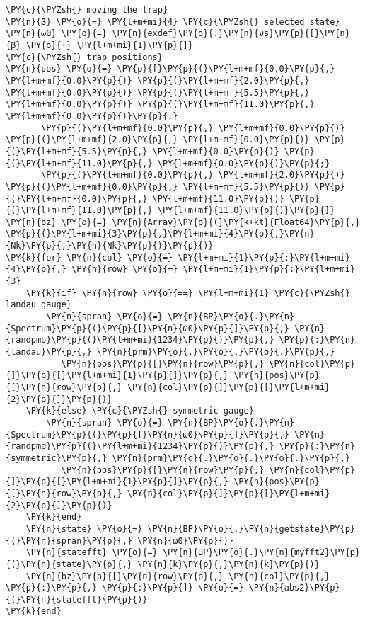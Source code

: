 \begin{Verbatim}[commandchars=\\\{\}]
\PY{c}{\PYZsh{} moving the trap}
\PY{n}{β} \PY{o}{=} \PY{l+m+mi}{4} \PY{c}{\PYZsh{} selected state}
\PY{n}{ω0} \PY{o}{=} \PY{n}{exdef}\PY{o}{.}\PY{n}{νs}\PY{p}{[}\PY{n}{β} \PY{o}{+} \PY{l+m+mi}{1}\PY{p}{]}
\PY{c}{\PYZsh{} trap positions}
\PY{n}{pos} \PY{o}{=} \PY{p}{[}\PY{p}{(}\PY{l+m+mf}{0.0}\PY{p}{,} \PY{l+m+mf}{0.0}\PY{p}{)} \PY{p}{(}\PY{l+m+mf}{2.0}\PY{p}{,} \PY{l+m+mf}{0.0}\PY{p}{)} \PY{p}{(}\PY{l+m+mf}{5.5}\PY{p}{,} \PY{l+m+mf}{0.0}\PY{p}{)} \PY{p}{(}\PY{l+m+mf}{11.0}\PY{p}{,} \PY{l+m+mf}{0.0}\PY{p}{)}\PY{p}{;}
       \PY{p}{(}\PY{l+m+mf}{0.0}\PY{p}{,} \PY{l+m+mf}{0.0}\PY{p}{)} \PY{p}{(}\PY{l+m+mf}{2.0}\PY{p}{,} \PY{l+m+mf}{0.0}\PY{p}{)} \PY{p}{(}\PY{l+m+mf}{5.5}\PY{p}{,} \PY{l+m+mf}{0.0}\PY{p}{)} \PY{p}{(}\PY{l+m+mf}{11.0}\PY{p}{,} \PY{l+m+mf}{0.0}\PY{p}{)}\PY{p}{;}
       \PY{p}{(}\PY{l+m+mf}{0.0}\PY{p}{,} \PY{l+m+mf}{2.0}\PY{p}{)} \PY{p}{(}\PY{l+m+mf}{0.0}\PY{p}{,} \PY{l+m+mf}{5.5}\PY{p}{)} \PY{p}{(}\PY{l+m+mf}{0.0}\PY{p}{,} \PY{l+m+mf}{11.0}\PY{p}{)} \PY{p}{(}\PY{l+m+mf}{11.0}\PY{p}{,} \PY{l+m+mf}{11.0}\PY{p}{)}\PY{p}{]}
\PY{n}{bz} \PY{o}{=} \PY{n}{Array}\PY{p}{(}\PY{k+kt}{Float64}\PY{p}{,} \PY{p}{(}\PY{l+m+mi}{3}\PY{p}{,}\PY{l+m+mi}{4}\PY{p}{,}\PY{n}{Nk}\PY{p}{,}\PY{n}{Nk}\PY{p}{)}\PY{p}{)}
\PY{k}{for} \PY{n}{col} \PY{o}{=} \PY{l+m+mi}{1}\PY{p}{:}\PY{l+m+mi}{4}\PY{p}{,} \PY{n}{row} \PY{o}{=} \PY{l+m+mi}{1}\PY{p}{:}\PY{l+m+mi}{3}
    \PY{k}{if} \PY{n}{row} \PY{o}{==} \PY{l+m+mi}{1} \PY{c}{\PYZsh{} landau gauge}
        \PY{n}{spran} \PY{o}{=} \PY{n}{BP}\PY{o}{.}\PY{n}{Spectrum}\PY{p}{(}\PY{p}{[}\PY{n}{ω0}\PY{p}{]}\PY{p}{,} \PY{n}{randpmp}\PY{p}{(}\PY{l+m+mi}{1234}\PY{p}{)}\PY{p}{,} \PY{p}{:}\PY{n}{landau}\PY{p}{,} \PY{n}{prm}\PY{o}{.}\PY{o}{.}\PY{o}{.}\PY{p}{,}
           \PY{n}{pos}\PY{p}{[}\PY{n}{row}\PY{p}{,} \PY{n}{col}\PY{p}{]}\PY{p}{[}\PY{l+m+mi}{1}\PY{p}{]}\PY{p}{,} \PY{n}{pos}\PY{p}{[}\PY{n}{row}\PY{p}{,} \PY{n}{col}\PY{p}{]}\PY{p}{[}\PY{l+m+mi}{2}\PY{p}{]}\PY{p}{)}
    \PY{k}{else} \PY{c}{\PYZsh{} symmetric gauge}
        \PY{n}{spran} \PY{o}{=} \PY{n}{BP}\PY{o}{.}\PY{n}{Spectrum}\PY{p}{(}\PY{p}{[}\PY{n}{ω0}\PY{p}{]}\PY{p}{,} \PY{n}{randpmp}\PY{p}{(}\PY{l+m+mi}{1234}\PY{p}{)}\PY{p}{,} \PY{p}{:}\PY{n}{symmetric}\PY{p}{,} \PY{n}{prm}\PY{o}{.}\PY{o}{.}\PY{o}{.}\PY{p}{,}
           \PY{n}{pos}\PY{p}{[}\PY{n}{row}\PY{p}{,} \PY{n}{col}\PY{p}{]}\PY{p}{[}\PY{l+m+mi}{1}\PY{p}{]}\PY{p}{,} \PY{n}{pos}\PY{p}{[}\PY{n}{row}\PY{p}{,} \PY{n}{col}\PY{p}{]}\PY{p}{[}\PY{l+m+mi}{2}\PY{p}{]}\PY{p}{)}
    \PY{k}{end}
    \PY{n}{state} \PY{o}{=} \PY{n}{BP}\PY{o}{.}\PY{n}{getstate}\PY{p}{(}\PY{n}{spran}\PY{p}{,} \PY{n}{ω0}\PY{p}{)}
    \PY{n}{statefft} \PY{o}{=} \PY{n}{BP}\PY{o}{.}\PY{n}{myfft2}\PY{p}{(}\PY{n}{state}\PY{p}{,} \PY{n}{k}\PY{p}{,}\PY{n}{k}\PY{p}{)}
    \PY{n}{bz}\PY{p}{[}\PY{n}{row}\PY{p}{,} \PY{n}{col}\PY{p}{,} \PY{p}{:}\PY{p}{,} \PY{p}{:}\PY{p}{]} \PY{o}{=} \PY{n}{abs2}\PY{p}{(}\PY{n}{statefft}\PY{p}{)}
\PY{k}{end}


\end{Verbatim}
